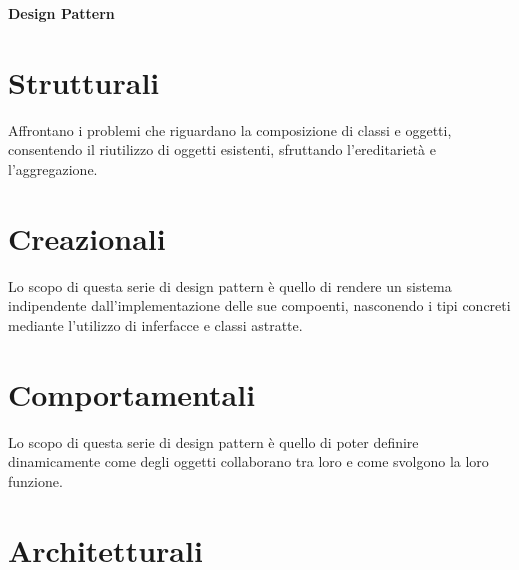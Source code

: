 \documentclass[a4paper,11pt]{article}
\begin{document}
\textbf{Design Pattern}

\tableofcontents %
\listoffigures
\pagebreak

\section{Strutturali}
Affrontano i problemi che riguardano la composizione di classi e oggetti, consentendo il riutilizzo di oggetti esistenti, sfruttando l’ereditarietà e l’aggregazione.






\section{Creazionali}
Lo scopo di questa serie di design pattern è quello di rendere un sistema indipendente dall'implementazione delle sue compoenti, nasconendo i tipi concreti mediante l'utilizzo di inferfacce e classi astratte.





\section{Comportamentali}
Lo scopo di questa serie di design pattern è quello di poter definire dinamicamente come degli oggetti collaborano tra loro e come svolgono la loro funzione.








\section{Architetturali}



\end{document}
